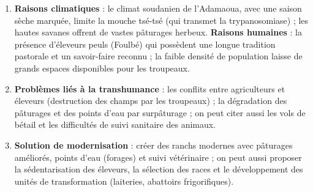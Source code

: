 \documentclass[11pt]{article}
\begin{document}
\begin{corrige}
\begin{enumerate}
\item \textbf{Raisons climatiques} : le climat soudanien de l'Adamaoua, avec une saison sèche marquée, limite la mouche tsé-tsé (qui transmet la trypanosomiase) ; les hautes savanes offrent de vastes pâturages herbeux. \textbf{Raisons humaines} : la présence d'éleveurs peuls (Foulbé) qui possèdent une longue tradition pastorale et un savoir-faire reconnu ; la faible densité de population laisse de grands espaces disponibles pour les troupeaux.
\item \textbf{Problèmes liés à la transhumance} : les conflits entre agriculteurs et éleveurs (destruction des champs par les troupeaux) ; la dégradation des pâturages et des points d'eau par surpâturage ; on peut citer aussi les vols de bétail et les difficultés de suivi sanitaire des animaux.
\item \textbf{Solution de modernisation} : créer des ranchs modernes avec pâturages améliorés, points d'eau (forages) et suivi vétérinaire ; on peut aussi proposer la sédentarisation des éleveurs, la sélection des races et le développement des unités de transformation (laiteries, abattoirs frigorifiques).
\end{enumerate}
\end{corrige}
\end{document}
